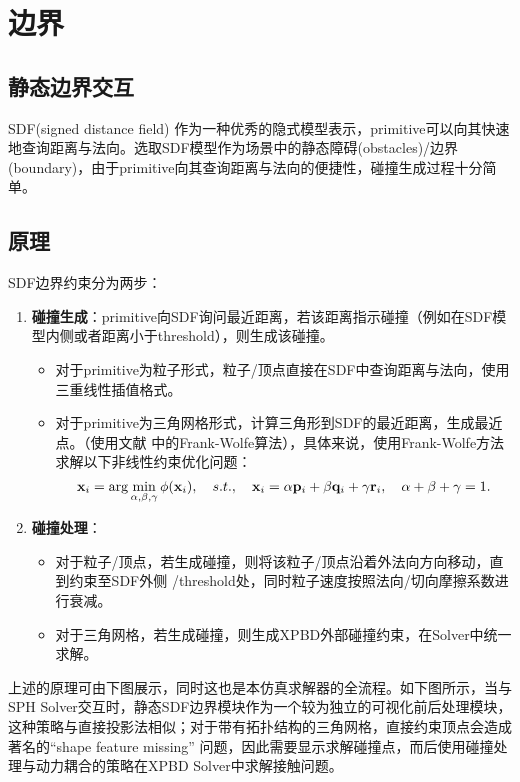 \section{边界}
\subsection{静态边界交互}
SDF(signed distance field) 作为一种优秀的隐式模型表示，primitive可以向其快速地查询距离与法向。选取SDF模型作为场景中的静态障碍(obstacles)/边界(boundary)，由于primitive向其查询距离与法向的便捷性，碰撞生成过程十分简单。
\subsection{原理}
SDF边界约束分为两步：
\begin{enumerate}
	\item \textbf{碰撞生成}：primitive向SDF询问最近距离，若该距离指示碰撞（例如在SDF模型内侧或者距离小于threshold），则生成该碰撞。
	      \begin{itemize}
		      \item 对于primitive为粒子形式，粒子/顶点直接在SDF中查询距离与法向，使用三重线性插值格式。
		      \item 对于primitive为三角网格形式，计算三角形到SDF的最近距离，生成最近点。（使用文献 \cite{macklin_local_2020} 中的Frank-Wolfe算法），具体来说，使用Frank-Wolfe方法求解以下非线性约束优化问题：
		            \begin{equation}
			            \mathbf x_i =	\arg\min_{\alpha,\beta,\gamma}\phi(\mathbf x_i),\\ \quad s.t.,\quad \mathbf x_i =\alpha \mathbf p_i + \beta\mathbf q_i + \gamma\mathbf r_i, \quad \alpha +\beta  + \gamma = 1.
		            \end{equation}

	      \end{itemize}
	      \item\textbf{ 碰撞处理}：
	      \begin{itemize}
		      \item 对于粒子/顶点，若生成碰撞，则将该粒子/顶点沿着外法向方向移动，直到约束至SDF外侧 /threshold处，同时粒子速度按照法向/切向摩擦系数进行衰减。
		      \item 对于三角网格，若生成碰撞，则生成XPBD外部碰撞约束，在Solver中统一求解。
	      \end{itemize}
\end{enumerate}
上述的原理可由下图展示，同时这也是本仿真求解器的全流程。如下图所示，当与SPH Solver交互时，静态SDF边界模块作为一个较为独立的可视化前后处理模块，这种策略与直接投影法相似；对于带有拓扑结构的三角网格，直接约束顶点会造成著名的“shape feature missing” 问题，因此需要显示求解碰撞点，而后使用碰撞处理与动力耦合的策略在XPBD Solver中求解接触问题。

